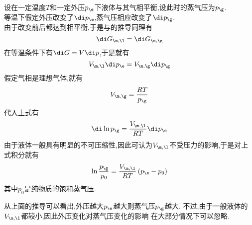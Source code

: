 \documentclass{ctexart}
\begin{document}
\begin{derivation}
    设在一定温度$T$和一定外压$p_\e$下液体与其气相平衡,设此时的蒸气压为$p_\g$.\\
    等温下假定外压改变了$\di p_\e$,蒸气压相应改变了$\di p_\g$.\\
    由于改变前后都达到相平衡,于是与的推导同理有
    \[\di G_{\m,\l}=\di G_{\m,\g}\]
    在等温条件下有$\di G=V\di p$,于是就有
    \[V_{\m,\l}\di p_\e=V_{\m,\g}\di p_\g\]
    假定气相是理想气体,就有
    \[V_{\m,\g}=\dfrac{RT}{p_\g}\]
    代入上式有
    \[\di\ln p_\g=\dfrac{V_{\m,\l}}{RT}\di p_\e\]
    由于液体一般具有明显的不可压缩性,因此可认为$V_{\m,\l}$不受压力的影响,于是对上式积分就有
    \[\ln\dfrac{p_\g}{p_0}=\dfrac{V_{\m,\l}}{RT}\left(p_\e-p_0\right)\]
    其中$p_0$是纯物质的饱和蒸气压.
\end{derivation}
从上面的推导可以看出,外压越大$p_\e$越大则蒸气压$p_\g$越大.%
不过,由于一般液体的$V_{\m,\l}$都较小,因此外压变化对蒸气压变化的影响%
在大部分情况下可以忽略.
\end{document}
